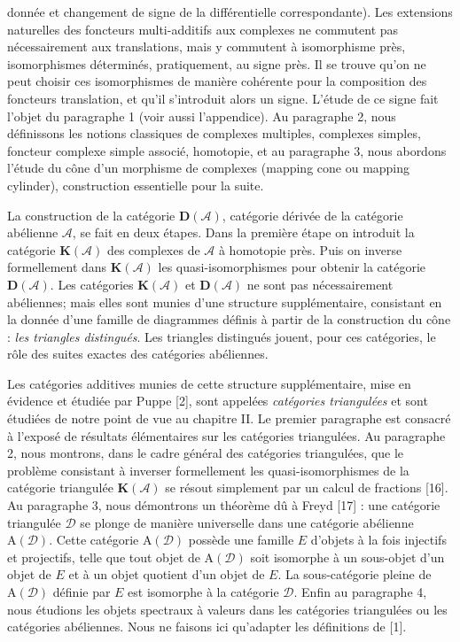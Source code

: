 %
donnée et changement de signe de la différentielle correspondante). Les
extensions naturelles des foncteurs multi-additifs aux complexes ne commutent
pas nécessairement aux translations, mais y commutent \og à isomorphisme
près\fg{}, isomorphismes déterminés, pratiquement, au signe près. Il se trouve
qu'on ne peut choisir ces isomorphismes de manière cohérente pour la
composition des \og foncteurs translation\fg{}, et qu'il s'introduit alors un
signe. L'étude de ce signe fait l'objet du paragraphe 1 (voir aussi
l'appendice). Au paragraphe 2, nous définissons les notions classiques de
complexes multiples, complexes simples, foncteur \og complexe simple
associé\fg{}, homotopie, et au paragraphe 3, nous abordons l'étude du cône
d'un morphisme de complexes (\og mapping cone\fg{} ou \og mapping
cylinder\fg{}), construction essentielle pour la suite.

La construction de la catégorie $\mathbf D(\mathcal A)$, catégorie dérivée de
la catégorie abélienne $\mathcal A$, se fait en deux étapes. Dans la première
étape on introduit la catégorie $\mathbf K(\mathcal A)$ des complexes de
$\mathcal A$ à homotopie près. Puis on inverse formellement dans
$\mathbf K(\mathcal A)$ les quasi-isomorphismes pour obtenir la catégorie
$\mathbf D(\mathcal A)$. Les catégories $\mathbf K(\mathcal A)$ et
$\mathbf D(\mathcal A)$ ne sont pas nécessairement abéliennes; mais elles
sont munies d'une structure supplémentaire, consistant en la donnée d'une
famille de diagrammes définis à partir de la construction du cône :
\emph{les triangles distingués}. Les triangles distingués jouent, pour ces
catégories, le rôle des suites exactes des catégories abéliennes.

Les catégories additives munies de cette structure supplémentaire, mise en
évidence et étudiée par Puppe [2], sont appelées
\emph{catégories triangulées} et sont étudiées de notre point de vue au
chapitre II. Le premier paragraphe est consacré à l'exposé de résultats
élémentaires sur les catégories triangulées. Au paragraphe 2, nous montrons,
dans le cadre général des catégories triangulées, que le problème consistant
à inverser formellement les quasi-isomorphismes de la catégorie triangulée
$\mathbf K(\mathcal A)$ se résout simplement par un \og calcul de
fractions\fg{} [16]. Au paragraphe 3, nous démontrons un théorème dû à Freyd
[17] : une catégorie triangulée $\mathcal D$ se plonge de manière universelle
dans une catégorie abélienne $\mathrm A(\mathcal D)$. Cette catégorie
$\mathrm A(\mathcal D)$ possède une famille $E$ d'objets à la fois injectifs
et projectifs, telle que tout objet de $\mathrm A(\mathcal D)$ soit isomorphe
à un sous-objet d'un objet de $E$ et à un objet quotient d'un objet de $E$.
La sous-catégorie pleine de $\mathrm A(\mathcal D)$ définie par $E$ est
isomorphe à la catégorie $\mathcal D$. Enfin au paragraphe 4, nous étudions
les \og objets spectraux\fg{} à valeurs dans les catégories triangulées ou
les catégories abéliennes. Nous ne faisons ici qu'adapter les définitions de
[1].

